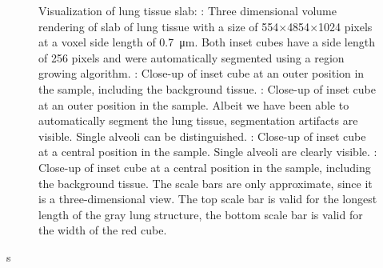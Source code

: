 \begin{figure}
{%
	 	\label{subfig:LungSlabDetailsRedBG}%
		}
	\caption{Visualization of lung tissue slab: %
		: Three dimensional volume rendering of slab of lung tissue with a size of 554$\times$4854$\times$1024 pixels at a voxel side length of \SI{0.7}{\micro\meter}. Both inset cubes have a side length of 256 pixels and were automatically segmented using a region growing algorithm. 
 		: Close-up of inset cube at an outer position in the sample, including the background tissue. %
 		: Close-up of inset cube at an outer position in the sample. Albeit we have been able to automatically segment the lung tissue, segmentation artifacts are visible. Single alveoli can be distinguished. %
 		: Close-up of inset cube at a central position in the sample. Single alveoli are clearly visible. %
 		: Close-up of inset cube at a central position in the sample, including the background tissue. %
		The scale bars are only approximate, since it is a three-dimensional view. The top scale bar is valid for the longest length of the gray lung structure, the bottom scale bar is valid for the width of the red cube.%
	}
	\label{fig:LungSlabSophie}
\end{figure}s